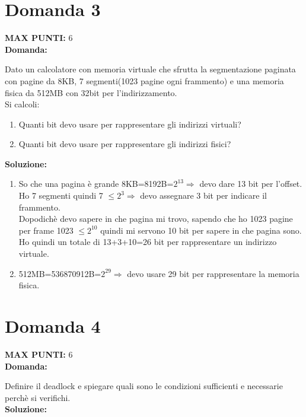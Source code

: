 \documentclass{article}
\begin{document}
    \section*{Domanda 3}
    \textbf{MAX PUNTI:} 6\\
    \textbf{Domanda:}


    Dato un calcolatore con memoria virtuale che sfrutta la segmentazione paginata con pagine da 8KB, 7 segmenti(1023 pagine ogni frammento) e una memoria fisica da 512MB con 32bit per l'indirizzamento.\\
    Si calcoli:
    \begin{enumerate}
        \item Quanti bit devo usare per rappresentare gli indirizzi virtuali?
        \item Quanti bit devo usare per rappresentare gli indirizzi fisici?
    \end{enumerate}
    \textbf{Soluzione:}
    \begin{enumerate}
        \item So che una pagina è grande 8KB=8192B=$2^{13} \Rightarrow$ devo dare 13 bit per l'offset.\\
            Ho 7 segmenti quindi 7 $\le 2^{3} \Rightarrow$ devo assegnare 3 bit per indicare il frammento.\\
            Dopodichè devo sapere in che pagina mi trovo, sapendo che ho 1023 pagine per frame 1023 $\le 2^{10}$ quindi mi servono 10 bit per sapere in che pagina sono.\\
            Ho quindi un totale di 13+3+10=26 bit per rappresentare un indirizzo virtuale.
        \item 512MB=536870912B=$2^{29} \Rightarrow$ devo usare 29 bit per rappresentare la memoria fisica.
    \end{enumerate}
    \section*{Domanda 4}
    \textbf{MAX PUNTI:} 6\\
    \textbf{Domanda:}


    Definire il deadlock e spiegare quali sono le condizioni sufficienti e necessarie perchè si verifichi.\\
    \textbf{Soluzione:}
\end{document}
